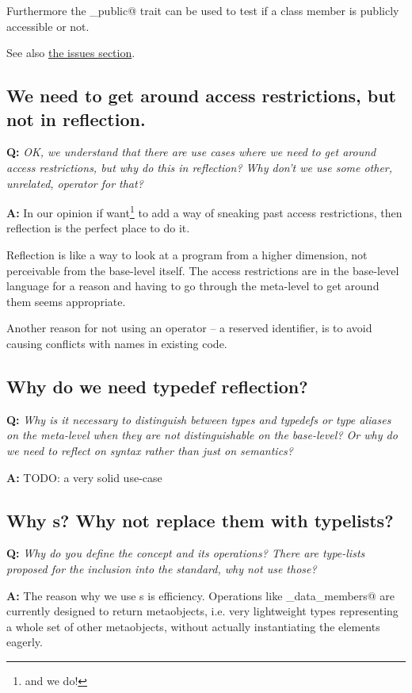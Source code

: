 Furthermore the \verb@is_public@ trait can be used to test if a class member
is publicly accessible or not.

See also \hyperref[issue-breaking-access]{the issues section}.

\subsection{We need to get around access restrictions, but not in reflection.}

\textbf{Q:} {\em OK, we understand that there are use cases where we need
to get around access restrictions, but why do this in reflection?
Why don't we use some other, unrelated,  operator for that?}

\textbf{A:}
In our opinion if want\footnote{and we do!} to add a way of sneaking past
access restrictions, then reflection is the perfect place to do it.

Reflection is like a way to look at a program from a higher dimension,
not perceivable from the base-level itself. The access restrictions are in
the base-level language for a reason and having to go through the meta-level
to get around them seems appropriate.

Another reason for not using an operator -- a reserved identifier, is to avoid
causing conflicts with names in existing code.

\subsection{Why do we need typedef reflection?}

\textbf{Q:} {\em Why is it necessary to distinguish between types and typedefs
or type aliases on the meta-level when they are not distinguishable on the
base-level? Or why do we need to reflect on syntax rather than just on semantics?}

\textbf{A:}
TODO: a very solid use-case

\subsection{Why s? Why not replace them with typelists?}

\textbf{Q:} {\em Why do you define the  concept and its
operations? There are type-lists proposed for the inclusion into the standard,
why not use those?}

\textbf{A:} The reason why we use s is efficiency.
Operations like \verb@get_data_members@ are currently designed to return
metaobjects, i.e.  very lightweight types representing a whole set of
other metaobjects, without actually instantiating the elements eagerly.

